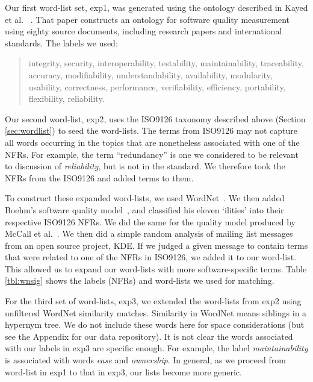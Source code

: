 \documentclass[smallextended]{svjour3}       %
\begin{document}
Our first word-list set, \textsf{exp1}, was generated using the ontology described in Kayed et al.~\cite{5072519} .
That paper constructs an ontology for software quality measurement using eighty source documents, including research papers and international standards. 
The labels we used:

\begin{quotation}
\small \noindent \textsf{
integrity, security,
interoperability, testability, maintainability, traceability,
accuracy, modifiability, understandability, availability, modularity,
usability, correctness, performance, verifiability, efficiency,
portability, flexibility, reliability.
}
\end{quotation}

Our second word-list, \textsf{exp2}, uses the ISO9126 taxonomy described above (Section \ref{sec:wordlist}) to seed the word-lists.
The terms from ISO9126 may not capture all words occurring in the topics that are nonetheless associated with one of the NFRs. 
For example, the term ``redundancy'' is one 
we considered to be
relevant to discussion of \emph{reliability}, but is not in the standard. 
We therefore took the NFRs from the ISO9126 and added terms to them.

To construct these expanded word-lists, we used
WordNet~\cite{Fellbaum1998}.
We then added Boehm's software quality model~\cite{Boehm+:1976:ICSE}, and classified his eleven `ilities' into their respective ISO9126 NFRs. 
We did the same for the quality model produced by McCall et al.~\cite{mccall1977}. 
We then did a simple random analysis of mailing list messages from an open source project, KDE. If we judged a given message to contain terms that were
related to one of the NFRs in ISO9126, we added it to our word-list. This allowed us to expand our word-lists with more software-specific terms.
Table \ref{tbl:wnsig} shows the labels (NFRs) and word-lists we used for matching.

For the third set of word-lists, \textsf{exp3}, we extended the word-lists from \textsf{exp2} using unfiltered WordNet similarity matches. 
Similarity in WordNet means siblings in a hypernym tree. 
We do not include these words here for space considerations (but see the Appendix for our data repository). 
It is not clear the words associated with our labels in \textsf{exp3} are specific enough. For example, the label \emph{maintainability} is associated with
words \emph{ease} and \emph{ownership}. In general, as we proceed from word-list in \textsf{exp1} to that in \textsf{exp3}, our lists become more generic.
\end{document}
